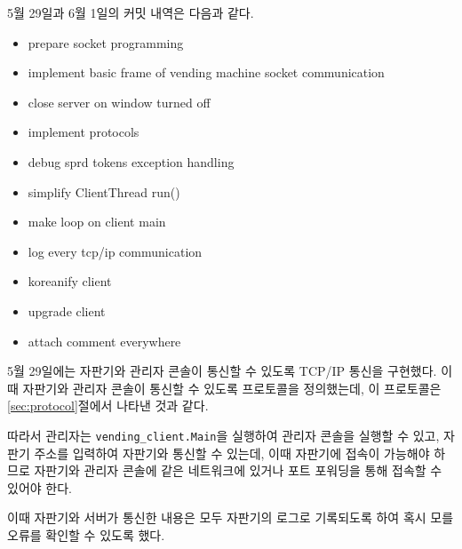 \documentclass{oblivoir}
\begin{document}
    5월 29일과 6월 1일의 커밋 내역은 다음과 같다.
    \begin{itemize}
        \item prepare socket programming
        \item implement basic frame of vending machine socket communication
        \item close server on window turned off
        \item implement protocols
        \item debug sprd tokens exception handling
        \item simplify ClientThread run()
        \item make loop on client main
        \item log every tcp/ip communication
        \item koreanify client
        \item upgrade client
        \item attach comment everywhere
    \end{itemize}

    5월 29일에는 자판기와 관리자 콘솔이 통신할 수 있도록 TCP/IP 통신을 구현했다.
    이 때 자판기와 관리자 콘솔이 통신할 수 있도록 프로토콜을 정의했는데,
    이 프로토콜은 \ref{sec:protocol}절에서 나타낸 것과 같다.

    따라서 관리자는 \texttt{vending\_client.Main}을 실행하여 관리자 콘솔을 실행할 수 있고,
    자판기 주소를 입력하여 자판기와 통신할 수 있는데,
    이때 자판기에 접속이 가능해야 하므로 자판기와 관리자 콘솔에 같은 네트워크에 있거나
    포트 포워딩을 통해 접속할 수 있어야 한다.

    이때 자판기와 서버가 통신한 내용은 모두 자판기의 로그로 기록되도록 하여
    혹시 모를 오류를 확인할 수 있도록 했다.
\end{document}

